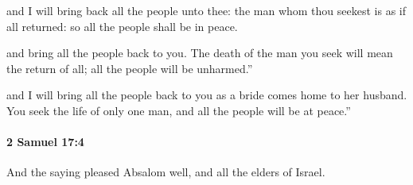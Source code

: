 			\begin{versebox}
					\item[BHS] 
					\item[ASV] and I will bring back all the people unto thee: the man whom thou seekest is as if all returned: so all the people shall be in peace.
					\item[NIV] and bring all the people back to you. The death of the man you seek will mean the return of all; all the people will be unharmed.”
					\item[NRSV] and I will bring all the people back to you as a bride comes home to her husband. You seek the life of only one man, and all the people will be at peace.”
			\end{versebox}

		\paragraph{2 Samuel 17:4} %
			\label{2SAMUEL-17-4}

			And the saying pleased Absalom well, and all the elders of Israel.

